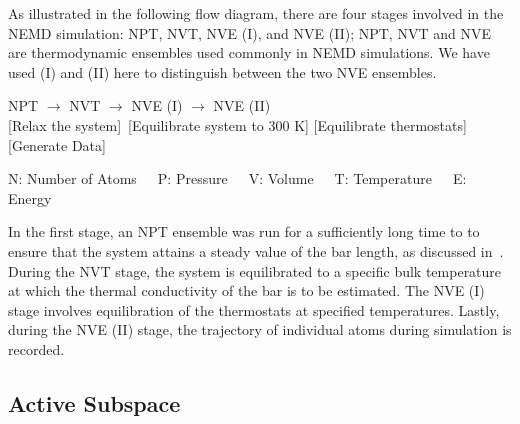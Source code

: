 As illustrated in the following flow diagram, there are four stages involved in the NEMD simulation: 
NPT, NVT, NVE (I), and
NVE (II); NPT, NVT and NVE are thermodynamic ensembles used commonly in NEMD simulations. We have used
(I) and (II) here to distinguish between the two NVE ensembles. 
%
\begin{center}

NPT \hspace{5mm} $\rightarrow$ \hspace{5mm} NVT \hspace{5mm} $\rightarrow$ \hspace{5mm} NVE (I) \hspace{5mm}
$\rightarrow$ \hspace{5mm} NVE (II)
\\ \vspace{1mm}
\tiny [Relax the system]~[Equilibrate system to 300 K] \hspace{1mm} [Equilibrate thermostats] \hspace{4mm}
 [Generate Data]
\\ \vspace{1mm}

\tiny{N: Number of Atoms~~~P: Pressure~~~V: Volume~~~T: Temperature~~~E: Energy}
\end{center}
%
In the first stage, an NPT ensemble was run for a sufficiently long time to to ensure that the 
system attains a steady value of the bar length, as discussed in~\cite{Vohra:2018a}.
During the NVT stage, the system is equilibrated to a specific bulk temperature at which the thermal
conductivity of the bar is to be estimated. The NVE (I) stage involves equilibration of the thermostats
at specified temperatures. Lastly, during the NVE (II) stage, the trajectory of individual atoms during
simulation is recorded.

\subsection{Active Subspace}
\label{sub:as}

